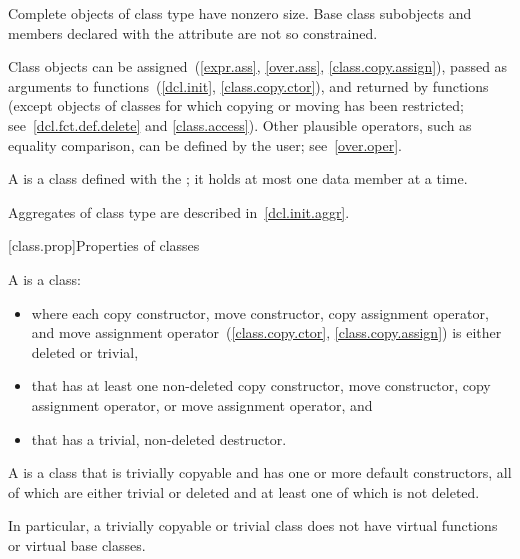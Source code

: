 \pnum
\begin{note}
Complete objects of class type have nonzero size.
Base class subobjects and
members declared with the  attribute
are not so constrained.
\end{note}

\pnum
\begin{note}
Class objects can be assigned~(\ref{expr.ass}, \ref{over.ass}, \ref{class.copy.assign}),
passed as arguments to functions~(\ref{dcl.init}, \ref{class.copy.ctor}), and
returned by functions (except objects of classes for which copying or moving has
been restricted; see~\ref{dcl.fct.def.delete} and \ref{class.access}).
Other plausible operators, such as equality comparison,
can be defined by the user; see~\ref{over.oper}.
\end{note}

\pnum
A  is a class defined with the 
;
it holds at most one data member at a time.
\begin{note}
Aggregates of class type are described in~\ref{dcl.init.aggr}.
\end{note}

[class.prop]{Properties of classes}

\pnum
A  is a class:

\begin{itemize}
\item where each copy constructor, move constructor, copy assignment operator,
and move assignment operator~(\ref{class.copy.ctor}, \ref{class.copy.assign})
is either deleted or trivial,
\item that has at least one non-deleted copy constructor, move constructor,
copy assignment operator, or move assignment operator, and
\item that has a trivial, non-deleted destructor.
\end{itemize}

\pnum
A  is a class that is trivially copyable and
has one or more default constructors,
all of which are either trivial or deleted and
at least one of which is not deleted.
\begin{note} In particular, a trivially copyable or trivial class does not have
virtual functions or virtual base classes.\end{note}

